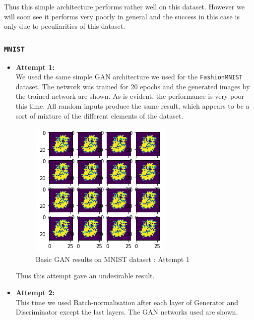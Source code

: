 \documentclass[conference]{IEEEtran}
\begin{document}
Thus this simple architecture performs rather well on this dataset. However we will soon see it performs very poorly in general and the success in this case is only due to peculiarities of this dataset.

\subsubsection{\texttt{MNIST}}
\begin{itemize}
    \item \textbf{Attempt 1:}\\
    We used the same simple GAN architecture we used for the \texttt{FashionMNIST} dataset. The network was trained for 20 epochs and the generated images by the trained network are shown. As is evident, the performance is very poor this time. All random inputs produce the same result, which appears to be a sort of mixture of the different elements of the dataset.
    
    \begin{figure}[h]
    \centering
    \includegraphics[scale = 0.6]{1st_attempt_on_mnist.png}
      \caption{Basic GAN results on MNIST dataset : Attempt 1}
    \end{figure}
    Thus this attempt gave an undesirable result.\\
    
    \item \textbf{Attempt 2:}\\
    This time we used Batch-normalisation after each layer of Generator and Discriminator except the last layers. The GAN networks used are shown.\\
    

\end{itemize}
\end{document}
